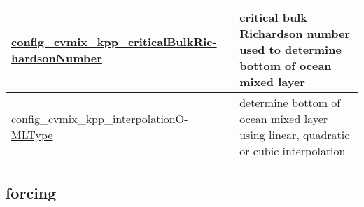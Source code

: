 {\begin{center}
\begin{longtable}{| p{2.0in} || p{4.0in} |}
	\hline
	\hyperref[sec:nm_sec_config_cvmix_kpp_criticalBulkRichardsonNumber]{config\_cvmix\_kpp\_criticalBulkRic-}\hyperref[sec:nm_sec_config_cvmix_kpp_criticalBulkRichardsonNumber]{hardsonNumber}& critical bulk Richardson number used to determine bottom of ocean mixed layer \\
	\hline
	\hyperref[sec:nm_sec_config_cvmix_kpp_interpolationOMLType]{config\_cvmix\_kpp\_interpolationO-}\hyperref[sec:nm_sec_config_cvmix_kpp_interpolationOMLType]{MLType}& determine bottom of ocean mixed layer using linear, quadratic or cubic interpolation \\
	\hline
\end{longtable}
\end{center}
}
\subsection[forcing]{forcing}
\label{subsec:forward_nm_tab_forcing}

\vspace{0.5in}
